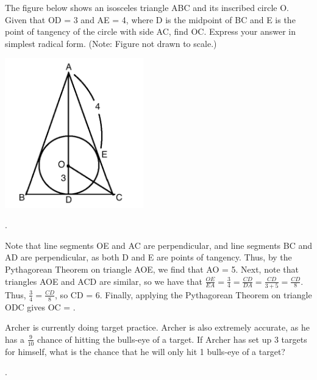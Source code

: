 \documentclass[11pt]{article}
\begin{document}
\begin{problem}
The figure below shows an isosceles triangle ABC and its inscribed circle O. Given that OD = 3 and AE = 4, where D is the midpoint of BC and E is the point of tangency of the circle with side AC, find OC. Express your answer in simplest radical form. (Note: Figure not drawn to scale.)
\begin{center}
\includegraphics[width=6cm]{triangle.png}
\end{center}
\end{problem}

\begin{answer}
.
\end{answer}

\begin{solution}
Note that line segments OE and AC are perpendicular, and line segments BC and AD are perpendicular, as both D and E are points of tangency. Thus, by the Pythagorean Theorem on triangle AOE, we find that AO = 5. Next, note that triangles AOE and ACD are similar, so we have that $\frac{OE}{EA} = \frac{3}{4} = \frac{CD}{DA} = \frac{CD}{3+5} = \frac{CD}{8}$. Thus, $\frac{3}{4} = \frac{CD}{8}$, so CD = 6. Finally, applying the Pythagorean Theorem on triangle ODC gives OC = .
\end{solution}

\begin{problem}
Archer is currently doing target practice. Archer is also extremely accurate, as he has a $\frac{9}{10}$ chance of hitting the bulls-eye of a target. If Archer has set up 3 targets for himself, what is the chance that he will only hit 1 bulls-eye of a target?
\end{problem}

\begin{answer}
.
\end{answer}
\end{document}
